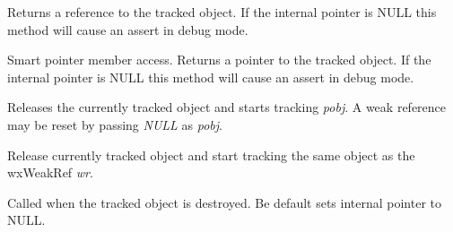 
Returns a reference to the tracked object. If the internal pointer is NULL
this method will cause an assert in debug mode.


\label{wxweakrefoperatorderef}


Smart pointer member access. Returns a pointer to the
tracked object. If the internal pointer is NULL this
method will cause an assert in debug mode.


\label{wxweakrefoperatorassign}


Releases the currently tracked object and starts tracking {\it pobj}.
A weak reference may be reset by passing {\it NULL} as {\it pobj}.


\label{wxweakrefoperatorassign2}


Release currently tracked object and start tracking the same object as
the wxWeakRef {\it wr}.


\label{wxweakrefonobjectdestroy}


Called when the tracked object is destroyed. Be default sets
internal pointer to NULL.


